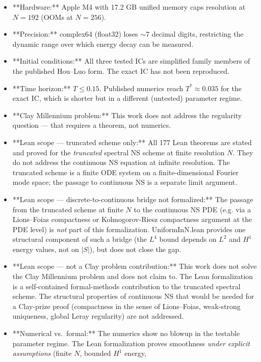 \documentclass[11pt]{article}
\begin{document}
\begin{itemize}
\item **Hardware:** Apple M4 with 17.2 GB unified memory caps resolution at
  $N = 192$ (OOMs at $N = 256$).
\item **Precision:** complex64 (float32) loses $\sim 7$ decimal digits,
  restricting the dynamic range over which energy decay can be measured.
\item **Initial conditions:** All three tested ICs are simplified family
  members of the published Hou--Luo form. The exact IC has not been
  reproduced.
\item **Time horizon:** $T \le 0.15$. Published numerics reach $T^* \approx 0.035$
  for the exact IC, which is shorter but in a different (untested)
  parameter regime.
\item **Clay Millennium problem:** This work does not address the regularity
  question --- that requires a theorem, not numerics.
\item **Lean scope --- truncated scheme only:** All 177 Lean theorems are
  stated and proved for the \emph{truncated} spectral NS scheme at finite
  resolution $N$. They do not address the continuous NS equation at
  infinite resolution. The truncated scheme is a finite ODE system on a
  finite-dimensional Fourier mode space; the passage to continuous NS is
  a separate limit argument.
\item **Lean scope --- discrete-to-continuous bridge not formalized:** The
  passage from the truncated scheme at finite $N$ to the continuous NS
  PDE (e.g. via a Lions--Foias compactness or Kolmogorov-Riesz compactness
  argument at the PDE level) is \emph{not} part of this formalization.
  UniformInN.lean provides one structural component of such a bridge
  (the $L^4$ bound depends on $L^2$ and $H^1$ energy values, not on
  $|S|$), but does not close the gap.
\item **Lean scope --- not a Clay problem contribution:** This work does
  not solve the Clay Millennium problem and does not claim to. The Lean
  formalization is a self-contained formal-methods contribution to the
  truncated spectral scheme. The structural properties of continuous NS
  that would be needed for a Clay-prize proof (compactness in the
  sense of Lions--Foias, weak-strong uniqueness, global Leray
  regularity) are not addressed.
\item **Numerical vs.\ formal:** The numerics show no blowup in the
  testable parameter regime. The Lean formalization proves smoothness
  \emph{under explicit assumptions} (finite $N$, bounded $H^1$ energy,

\end{itemize}
\end{document}
